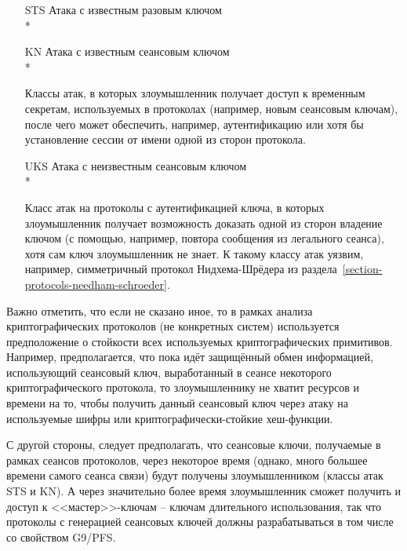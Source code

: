 \begin{itemize}
    \item[STS] Атака с известным разовым ключом\\*
    \item[KN] Атака с известным сеансовым ключом\\*
    \item[{}] Классы атак, в которых злоумышленник получает доступ к временным секретам, используемых в протоколах (например, новым сеансовым ключам), после чего может обеспечить, например, аутентификацию или хотя бы установление сессии от имени одной из сторон протокола.

    \item[UKS] Атака с неизвестным сеансовым ключом\\*
    \item[{}] Класс атак на протоколы с аутентификацией ключа, в которых злоумышленник получает возможность доказать одной из сторон владение ключом (с помощью, например, повтора сообщения из легального сеанса), хотя сам ключ злоумышленник не знает. К такому классу атак уязвим, например, симметричный протокол Нидхема-Шрёдера из раздела~\ref{section-protocols-needham-schroeder}.

\end{itemize}

Важно отметить, что если не сказано иное, то в рамках анализа криптографических протоколов (не конкретных систем) используется предположение о стойкости всех используемых криптографических примитивов. Например, предполагается, что пока идёт защищённый обмен информацией, использующий сеансовый ключ, выработанный в сеансе некоторого криптографического протокола, то злоумышленнику не хватит ресурсов и времени на то, чтобы получить данный сеансовый ключ через атаку на используемые шифры или криптографически-стойкие хеш-функции.

С другой стороны, следует предполагать, что сеансовые ключи, получаемые в рамках сеансов протоколов, через некоторое время (однако, много большее времени самого сеанса связи) будут получены злоумышленником (классы атак STS и KN). А через значительно более время злоумышленник сможет получить и доступ к <<мастер>>-ключам -- ключам длительного использования, так что протоколы с генерацией сеансовых ключей должны разрабатываться в том числе со свойством G9/PFS.

